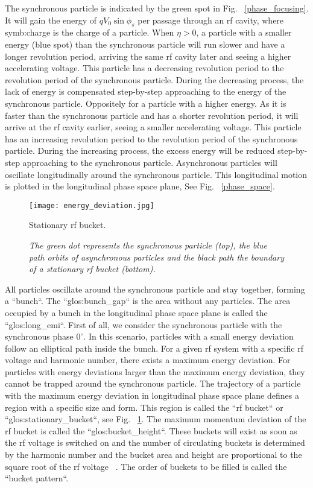 The synchronous particle is indicated by the green spot in Fig. ~\ref{phase_focusing}. It will gain the energy of $qV_0\sin\phi_{\mathit{s}}$ per passage through an rf cavity, where \gls{symb:charge} is the charge of a particle.  When $\eta > 0$, a particle with a smaller energy (blue spot) than the synchronous particle will run slower and have a longer revolution period, arriving the same rf cavity later and seeing a higher accelerating voltage. This particle has a decreasing revolution period to the revolution period of the synchronous particle. During the decreasing process, the lack of energy is compensated step-by-step approaching to the energy of the synchronous particle. Oppositely for a particle with a higher energy. As it is faster than the synchronous particle and has a shorter revolution period, it will arrive at the rf cavity earlier, seeing a smaller accelerating voltage. This particle has an increasing revolution period to the revolution period of the synchronous particle. During the increasing process, the excess energy will be reduced step-by-step approaching to the synchronous particle. Asynchronous particles will oscillate longitudinally around the synchronous particle. This longitudinal motion is plotted in the longitudinal phase space plane, See Fig. ~\ref{phase_space}.

\begin{figure}[H]
   \centering   
   \texttt{[image: energy\_deviation.jpg]}
   \caption{Stationary rf bucket.}
	\caption*{\textsl{\small{The green dot represents the synchronous particle (top), the blue path orbits of asynchronous particles and the black path the boundary of a stationary rf bucket (bottom).}}}
   \label{energy_deviation}
\end{figure} 
All particles oscillate around the synchronous particle and stay together, forming a ``bunch``. The ``\gls{glos:bunch_gap}`` is the area without any particles. The area occupied by a bunch in the longitudinal phase space plane is called the ``\gls{glos:long_emi}``. First of all, we consider the synchronous particle with the synchronous phase $0^\circ$. In this scenario, particles with a small energy deviation follow an elliptical path inside the bunch. For a given rf system with a specific rf voltage and harmonic number, there exists a maximum energy deviation. For particles with energy deviations larger than the maximum energy deviation, they cannot be trapped around the synchronous particle. The trajectory of a particle with the maximum energy deviation in longitudinal phase space plane defines a region with a specific size and form. This region is called the ``rf bucket`` or ``\gls{glos:stationary_bucket}``, see Fig. ~\ref{energy_deviation}. The maximum momentum deviation of the rf bucket is called the ``\gls{glos:bucket_height}``. These buckets will exist as soon as the rf voltage is switched on and the number of circulating buckets is determined by the harmonic number and the bucket area and height are proportional to the square root of the rf voltage ~\cite{lee_accelerator_2011}. The order of buckets to be filled is called the ``bucket pattern``.


